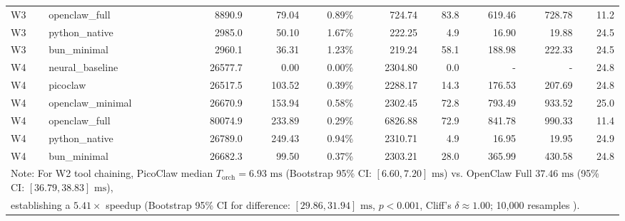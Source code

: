 \begin{table}[t]
\begin{tabular}{llrrrrrrrr}
W3 & openclaw\_full & 8890.9 & 79.04 & 0.89\% & 724.74 & 83.8 & 619.46 & 728.78 & 11.2 \\
W3 & python\_native & 2985.0 & 50.10 & 1.67\% & 222.25 & 4.9 & 16.90 & 19.88 & 24.5 \\
W3 & bun\_minimal & 2960.1 & 36.31 & 1.23\% & 219.24 & 58.1 & 188.98 & 222.33 & 24.5 \\
\midrule
W4 & neural\_baseline & 26577.7 & 0.00 & 0.00\% & 2304.80 & 0.0 & - & - & 24.8 \\
W4 & picoclaw & 26517.5 & 103.52 & 0.39\% & 2288.17 & 14.3 & 176.53 & 207.69 & 24.8 \\
W4 & openclaw\_minimal & 26670.9 & 153.94 & 0.58\% & 2302.45 & 72.8 & 793.49 & 933.52 & 25.0 \\
W4 & openclaw\_full & 80074.9 & 233.89 & 0.29\% & 6826.88 & 72.9 & 841.78 & 990.33 & 11.4 \\
W4 & python\_native & 26789.0 & 249.43 & 0.94\% & 2310.71 & 4.9 & 16.95 & 19.95 & 24.9 \\
W4 & bun\_minimal & 26682.3 & 99.50 & 0.37\% & 2303.21 & 28.0 & 365.99 & 430.58 & 24.8 \\
\midrule
\multicolumn{10}{l}{\footnotesize Note: For W2 tool chaining, PicoClaw median $T_{\text{orch}} = 6.93\text{ ms}$ (Bootstrap 95\% CI: $[6.60, 7.20]\text{ ms}$) vs. OpenClaw Full $37.46\text{ ms}$ (95\% CI: $[36.79, 38.83]\text{ ms}$),} \\
\multicolumn{10}{l}{\footnotesize establishing a $5.41\times$ speedup (Bootstrap 95\% CI for difference: $[29.86, 31.94]\text{ ms}$, $p < 0.001$, Cliff's $\delta \approx 1.00$; 10,000 resamples \cite{efron1979}).} \\
\bottomrule
\end{tabular}
\end{table}

